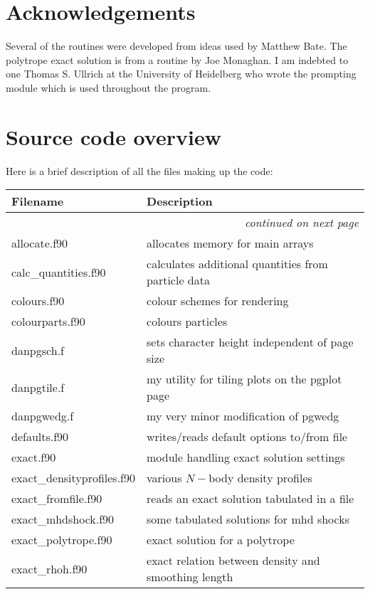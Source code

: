\documentclass[a4paper,11pt]{article}
\begin{document}
\section*{Acknowledgements}
 Several of the routines were developed from ideas used by Matthew Bate. The
polytrope exact solution is from a routine by Joe Monaghan. I am indebted to one
Thomas S. Ullrich at the University of Heidelberg who wrote the prompting module
which is used throughout the program.

\newpage
\appendix

\section{Source code overview}
Here is a brief description of all the files making up the code:
\begin{longtable}{|lp{}|}
\hline
Filename & Description \\
\hline \endhead
\multicolumn{2}{|r|}{\emph{continued on next page}} \\
\hline \endfoot
\hline \endlastfoot
     allocate.f90           & allocates memory for main arrays \\
     calc\_quantities.f90    & calculates additional quantities from particle data \\
     colours.f90            & colour schemes for rendering\\
     colourparts.f90	 & colours particles\\
     danpgsch.f           & sets character height independent of page size\\
     danpgtile.f          & my utility for tiling plots on the pgplot page\\
     danpgwedg.f          & my very minor modification of pgwedg\\
     defaults.f90           & writes/reads default options to/from file\\
     exact.f90              & module handling exact solution settings\\
     exact\_densityprofiles.f90 & various $N-$body density profiles \\
     exact\_fromfile.f90     & reads an exact solution tabulated in a file\\
     exact\_mhdshock.f90     & some tabulated solutions for mhd shocks\\ 
     exact\_polytrope.f90    & exact solution for a polytrope\\
     exact\_rhoh.f90	 & exact relation between density and smoothing length\\

\end{longtable}
\end{document}
